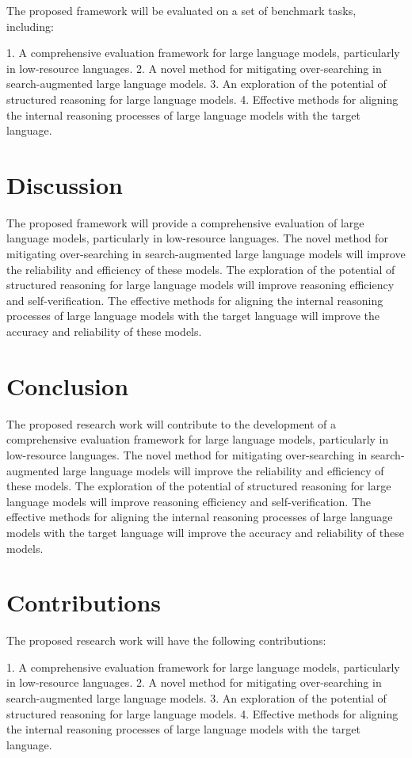 \documentclass{article}
\begin{document}
The proposed framework will be evaluated on a set of benchmark tasks, including:

1.  A comprehensive evaluation framework for large language models, particularly in low-resource languages.
2.  A novel method for mitigating over-searching in search-augmented large language models.
3.  An exploration of the potential of structured reasoning for large language models.
4.  Effective methods for aligning the internal reasoning processes of large language models with the target language.

\section{Discussion}

The proposed framework will provide a comprehensive evaluation of large language models, particularly in low-resource languages. The novel method for mitigating over-searching in search-augmented large language models will improve the reliability and efficiency of these models. The exploration of the potential of structured reasoning for large language models will improve reasoning efficiency and self-verification. The effective methods for aligning the internal reasoning processes of large language models with the target language will improve the accuracy and reliability of these models.

\section{Conclusion}

The proposed research work will contribute to the development of a comprehensive evaluation framework for large language models, particularly in low-resource languages. The novel method for mitigating over-searching in search-augmented large language models will improve the reliability and efficiency of these models. The exploration of the potential of structured reasoning for large language models will improve reasoning efficiency and self-verification. The effective methods for aligning the internal reasoning processes of large language models with the target language will improve the accuracy and reliability of these models.

\section{Contributions}

The proposed research work will have the following contributions:

1.  A comprehensive evaluation framework for large language models, particularly in low-resource languages.
2.  A novel method for mitigating over-searching in search-augmented large language models.
3.  An exploration of the potential of structured reasoning for large language models.
4.  Effective methods for aligning the internal reasoning processes of large language models with the target language.
\end{document}
